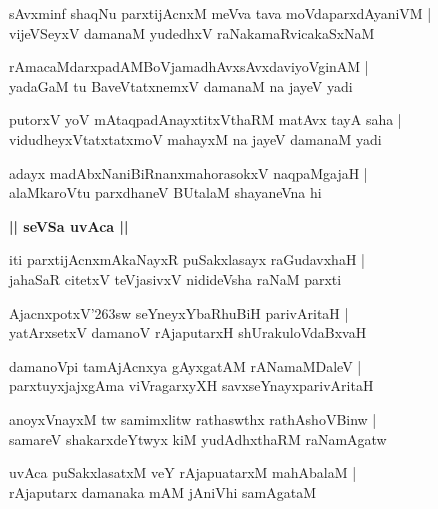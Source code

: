 \documentclass[twoside,12pt,openright]{book}
\def\S{\char'263}
\newcounter{shloka}[chapter]
\def\uvaca#1{\centerline{{\large\textbf{#1}}}}
\begin{document}
\begin{shloka}%
sAvxminf shaqNu parxtijAcnxM meVva tava moVdaparxdAyaniVM  |\\
vijeVSeyxV damanaM yudedhxV raNakamaRvicakaSxNaM 
\end{shloka}

\begin{shloka}%
rAmacaMdarxpadAMBoVjamadhAvxsAvxdaviyoVginAM |\\
yadaGaM tu BaveVtatxnemxV damanaM na jayeV yadi 
\end{shloka}

\begin{shloka}%
putorxV yoV mAtaqpadAnayxtitxVthaRM matAvx tayA saha |\\
vidudheyxVtatxtatxmoV mahayxM na jayeV damanaM yadi
\end{shloka}

\begin{shloka}%
adayx madAbxNaniBiRnanxmahorasokxV naqpaMgajaH |\\
alaMkaroVtu parxdhaneV BUtalaM shayaneVna hi 
\end{shloka}

\uvaca{|| seVSa uvAca ||}

\begin{shloka}%
iti parxtijAcnxmAkaNayxR puSakxlasayx raGudavxhaH |\\
jahaSaR citetxV teVjasivxV nidideVsha raNaM parxti
\end{shloka}

\begin{shloka}%
AjacnxpotxV\S sw seYneyxYbaRhuBiH parivAritaH |\\
yatArxsetxV damanoV rAjaputarxH shUrakuloVdaBxvaH 
\end{shloka}

\begin{shloka}%
damanoVpi tamAjAcnxya gAyxgatAM rANamaMDaleV |\\
parxtuyxjajxgAma viVragarxyXH savxseYnayxparivAritaH 
\end{shloka}

\begin{shloka}%
anoyxVnayxM tw samimxlitw rathaswthx rathAshoVBinw |\\
samareV shakarxdeYtwyx kiM yudAdhxthaRM raNamAgatw
\end{shloka}

\begin{shloka}%
uvAca puSakxlasatxM veY rAjapuatarxM mahAbalaM |\\
rAjaputarx damanaka mAM jAniVhi samAgataM 
\end{shloka}
\end{document}
